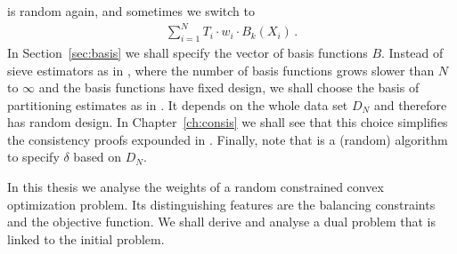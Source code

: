 is random again, and sometimes we switch to
\begin{gather*}
      \sum_{i = 1}^{N} 
      T_i
      \cdot
      w_i
      \cdot
      B_k(X_i)
      \,.
\end{gather*}
In Section~\ref{sec:basis} we shall specify the vector of basis functions $B$.
Instead of sieve estimators as in \cite{Wang2019}, where the number of basis functions grows slower than $N$ to $\infty$ 
and the basis functions have fixed design,
we shall choose the basis of partitioning estimates as in \cite[§4]{Gyorfi2002}.
It depends on the whole data set $D_N$
and therefore has random design.
In Chapter~\ref{ch:consis} we shall see that this choice simplifies the consistency proofs expounded in \cite[Proof of Lemma~2]{Wang2019}.
Finally, note that \cite[Algorithm~1 on page 11]{Wang2019}
is a (random) algorithm to specify $\delta$ based on $D_N$. 
\begin{takeaways}
  In this thesis we analyse the weights of a random constrained convex optimization problem.
  Its distinguishing features are the balancing constraints and the objective function.
  We shall derive and analyse a dual problem that is linked to the initial problem.
\end{takeaways}
